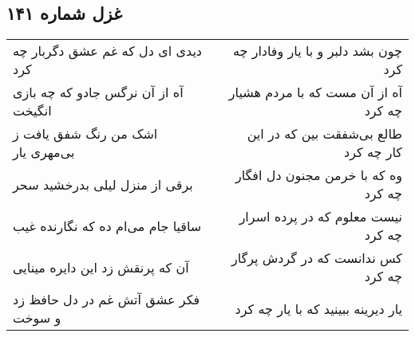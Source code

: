 \begin{center}
\section*{غزل شماره ۱۴۱}
\label{sec:sh141}
\begin{longtable}{l p{0.5cm} r}
دیدی ای دل که غم عشق دگربار چه کرد
&&
چون بشد دلبر و با یار وفادار چه کرد
\\
آه از آن نرگس جادو که چه بازی انگیخت
&&
آه از آن مست که با مردم هشیار چه کرد
\\
اشک من رنگ شفق یافت ز بی‌مهری یار
&&
طالع بی‌شفقت بین که در این کار چه کرد
\\
برقی از منزل لیلی بدرخشید سحر
&&
وه که با خرمن مجنون دل افگار چه کرد
\\
ساقیا جام می‌ام ده که نگارنده غیب
&&
نیست معلوم که در پرده اسرار چه کرد
\\
آن که پرنقش زد این دایره مینایی
&&
کس ندانست که در گردش پرگار چه کرد
\\
فکر عشق آتش غم در دل حافظ زد و سوخت
&&
یار دیرینه ببینید که با یار چه کرد
\\
\end{longtable}
\end{center}
